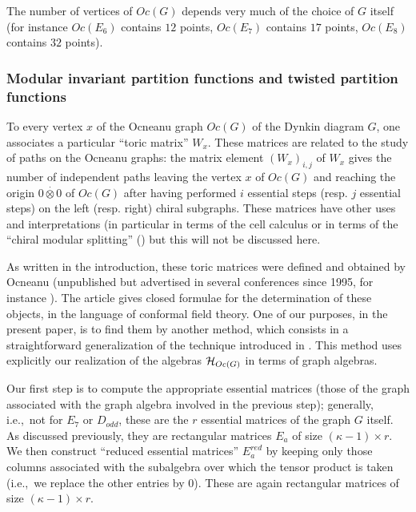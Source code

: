 \documentclass[a4paper,11pt]{article}
\def\ie{{\rm i.e.,\/}\ }
\def \otimesdot {\stackrel{\cdot}{\otimes}}
\begin{document}
       \smallskip
       
The number of vertices of
$Oc(G)$ depends very much of the choice of $G$ itself (for instance
$Oc(E_6)$ contains $12$
points, $Oc(E_7)$ contains $17$ points, $Oc(E_8)$ contains $32$
points).

\subsubsection{Modular invariant partition functions and twisted
partition functions}

To every vertex $x$ of the Ocneanu graph $Oc(G)$ of the Dynkin diagram $G$, one
associates a particular ``toric matrix'' $ W_{x}$. 
These matrices are related to the study of paths on the Ocneanu
graphs: the matrix element $ ({W_{x}})_{i,j}$ of  $ W_{x}$ gives the 
number of independent  paths leaving the vertex $x$ of 
$Oc(G)$ and reaching the origin $0 \otimesdot 0$ of $Oc(G)$ after 
having performed $i$ essential steps 
(resp. $j$ essential steps) on the left (resp. right) chiral subgraphs.
These matrices have other uses and interpretations 
(in particular in terms of the cell calculus or in terms of
the ``chiral modular splitting'' (\cite{Ocneanu:MSRI})
but this will not be discussed here.

As written in the introduction, these toric matrices
were defined and obtained by Ocneanu (unpublished but advertised in
several conferences since 1995, for instance \cite{Ocneanu:Marseille}).
The article \cite{PetZub:Oc} gives closed formulae for the
determination of these objects, in the language of conformal field theory.
One of our purposes, in the present paper,
is to find them by another method, which consists in
a straightforward generalization of
the technique introduced in \cite{Coque:qtetra}. This method uses
explicitly our realization of the algebras ${\cal H}_{Oc(G)}$ in
terms of graph algebras.

Our first step is to compute the appropriate essential matrices
(those of the graph
associated with the graph algebra
involved in the previous step); generally, \ie not for $E_7$ or
$D_{odd}$, these are
the $r$ essential
matrices of the graph $G$ itself.  As discussed previously, they are
rectangular matrices $E_a$ of size
$(\kappa -1) \times r$.
We then construct ``reduced essential matrices'' $E_a^{red}$ by
keeping only those columns associated
with the subalgebra over which the tensor product is taken (\ie we
replace the other entries by $0$). These are again
rectangular matrices of
size $ (\kappa -1) \times r$.
\end{document}
